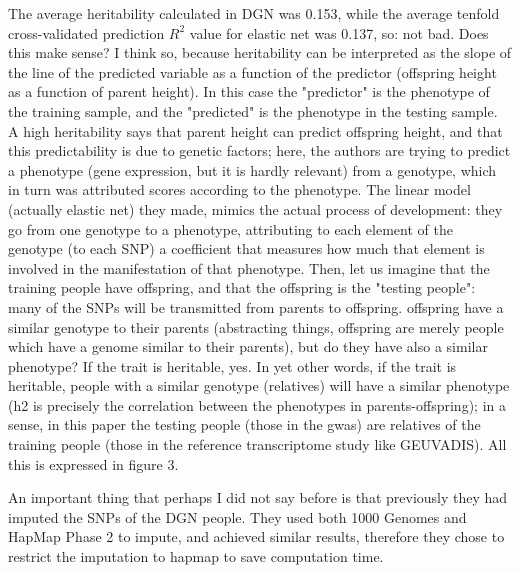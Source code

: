 \documentclass[../main.tex]{subfiles}
\begin{document}
The average heritability calculated in DGN was 0.153, while the average 
tenfold cross-validated prediction $R^2$ value for elastic net was 
0.137, so: not bad. Does this make sense? I think so, because 
  heritability can be interpreted as the slope of the line of the 
predicted variable as a function of the predictor (\eg offspring height 
as a function of parent height). In this case the "predictor" is the 
phenotype of the training sample, and the "predicted" is the phenotype 
in the testing sample. A high heritability says that parent height can 
predict offspring height, and that this predictability is due to genetic 
factors; here, the authors are trying to predict a phenotype (gene 
expression, but it is hardly relevant) from a genotype, which in turn 
was attributed scores according to the phenotype. The linear model 
(actually elastic net) they made, mimics the actual process of 
development: they go from one genotype to a phenotype, attributing to 
each element of the genotype (\ie to each SNP) a coefficient that 
measures how much that element is involved in the manifestation of that 
phenotype. Then, let us imagine that the training people have offspring, 
and that the offspring is the "testing people": many of the SNPs will be 
transmitted from parents to offspring. offspring have a similar genotype 
to their parents (abstracting things, offspring are merely people which 
have a genome similar to their parents), but do they have also a similar 
phenotype? If the trait is heritable, yes. In yet other words, if the 
trait is heritable, people with a similar genotype (\ie relatives) will 
have a similar phenotype (h2 is precisely the correlation between the 
phenotypes in parents-offspring); in a sense, in this paper the testing 
people (those in the gwas) are relatives of the training people (those 
in the reference transcriptome study like GEUVADIS). All this is 
expressed in figure 3.

An important thing that perhaps I did not say before is that previously 
they had imputed the SNPs of the DGN people. They used both 1000 Genomes 
and HapMap Phase 2 to impute, and achieved similar results, therefore 
they chose to restrict the imputation to hapmap to save computation 
time.
\end{document}
